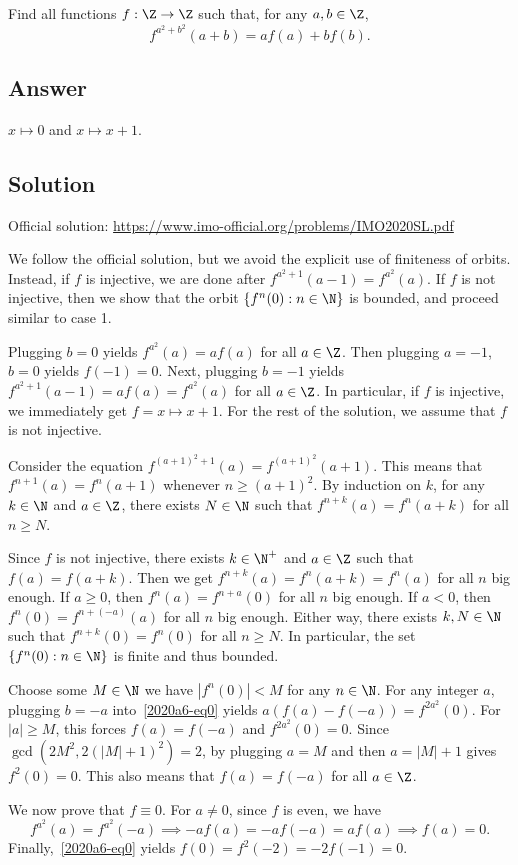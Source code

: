 Find all functions $f : \Z \to \Z$ such that, for any $a, b \in \Z$,
\[ f^{a^2 + b^2}(a + b) = a f(a) + b f(b). \tag{*}\label{2020a6-eq0} \]



\subsection*{Answer}

$x \mapsto 0$ and $x \mapsto x + 1$.



\subsection*{Solution}

Official solution: \url{https://www.imo-official.org/problems/IMO2020SL.pdf}

We follow the official solution, but we avoid the explicit use of finiteness of orbits.
Instead, if $f$ is injective, we are done after $f^{a^2 + 1}(a - 1) = f^{a^2}(a)$.
If $f$ is not injective, then we show that the orbit $\{f^n(0) : n \in \N\}$ is bounded, and proceed similar to case 1.

Plugging $b = 0$ yields $f^{a^2}(a) = a f(a)$ for all $a \in \Z$.
Then plugging $a = -1$, $b = 0$ yields $f(-1) = 0$.
Next, plugging $b = -1$ yields $f^{a^2 + 1}(a - 1) = a f(a) = f^{a^2}(a)$ for all $a \in \Z$.
In particular, if $f$ is injective, we immediately get $f = x \mapsto x + 1$.
For the rest of the solution, we assume that $f$ is not injective.

Consider the equation $f^{(a + 1)^2 + 1}(a) = f^{(a + 1)^2}(a + 1)$.
This means that $f^{n + 1}(a) = f^n(a + 1)$ whenever $n \geq (a + 1)^2$.
By induction on $k$, for any $k \in \N$ and $a \in \Z$, there exists $N \in \N$ such that $f^{n + k}(a) = f^n(a + k)$ for all $n \geq N$.

Since $f$ is not injective, there exists $k \in \N^+$ and $a \in \Z$ such that $f(a) = f(a + k)$.
Then we get $f^{n + k}(a) = f^n(a + k) = f^n(a)$ for all $n$ big enough.
If $a \geq 0$, then $f^n(a) = f^{n + a}(0)$ for all $n$ big enough.
If $a < 0$, then $f^n(0) = f^{n + (-a)}(a)$ for all $n$ big enough.
Either way, there exists $k, N \in \N$ such that $f^{n + k}(0) = f^n(0)$ for all $n \geq N$.
In particular, the set $\{f^n(0) : n \in \N\}$ is finite and thus bounded.

Choose some $M \in \N$ we have $|f^n(0)| < M$ for any $n \in \N$.
For any integer $a$, plugging $b = -a$ into~\eqref{2020a6-eq0} yields $a (f(a) - f(-a)) = f^{2a^2}(0)$.
For $|a| \geq M$, this forces $f(a) = f(-a)$ and $f^{2a^2}(0) = 0$.
Since $\gcd(2M^2, 2(|M| + 1)^2) = 2$, by plugging $a = M$ and then $a = |M| + 1$ gives $f^2(0) = 0$.
This also means that $f(a) = f(-a)$ for all $a \in \Z$.

We now prove that $f \equiv 0$.
For $a \neq 0$, since $f$ is even, we have
\[ f^{a^2}(a) = f^{a^2}(-a) \implies -a f(a) = -a f(-a) = a f(a) \implies f(a) = 0. \]
Finally,~\eqref{2020a6-eq0} yields $f(0) = f^2(-2) = -2 f(-1) = 0$.
